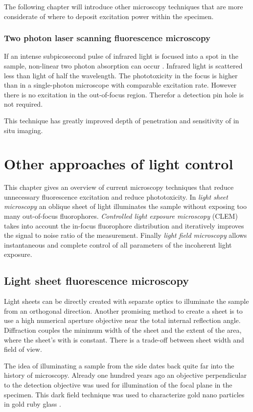The following chapter will introduce other microscopy techniques that
are more considerate of where to deposit excitation power within the
specimen.
\subsection{Two photon laser scanning fluorescence microscopy}
If an intense subpicosecond pulse of infrared light is focused into a
spot in the sample, non-linear two photon absorption can occur
\citep{Denk1990}. Infrared light is scattered less than light of half
the wavelength. The phototoxicity in the focus is higher than in a
single-photon microscope with comparable excitation rate. However
there is no excitation in the out-of-focus region. Therefor a
detection pin hole is not required.

This technique has greatly improved depth of penetration and
sensitivity of in situ imaging. %
\chapter{Other approaches of light control}
%
\begin{summary}
  This chapter gives an overview of current microscopy techniques that
  reduce unnecessary fluorescence excitation and reduce
  phototoxicity. In \emph{light sheet microscopy} an oblique sheet of
  light illuminates the sample without exposing too many out-of-focus
  fluorophores. \emph{Controlled light exposure microscopy}
  (CLEM) takes
  into account the in-focus fluorophore distribution and iteratively
  improves the signal to noise ratio of the measurement.  Finally
  \emph{light field microscopy} allows instantaneous and complete
  control of all parameters of the incoherent light exposure.
\end{summary}
\section{Light sheet fluorescence microscopy}
\begin{summary}
  Light sheets can be directly created with separate optics to
  illuminate the sample from an orthogonal direction. Another
  promising method to create a sheet is to use a high numerical
  aperture objective near the total internal reflection
  angle. Diffraction couples the minimum width of the sheet and the
  extent of the area, where the sheet's with is constant. There is a
  trade-off between sheet width and field of view.
\end{summary}
The idea of illuminating a sample from the side dates back quite
far into the history of microscopy. Already one hundred years ago an
objective perpendicular to the detection objective was used for
illumination of the focal plane in the specimen. This dark field
technique was used to characterize gold nano particles in gold ruby
glass \citep{Siedentopf1903}.

